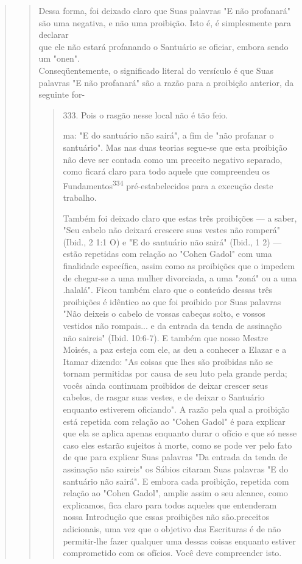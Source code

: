 \begin{quote}
\begin{quote}
Dessa forma, foi deixado claro que Suas palavras "E não profanará"\\
são uma negativa, e não uma proibição. Isto é, é simplesmente para
declarar\\
que ele não estará profanando o Santuário se oficiar, embora sendo um
"onen".\\
Conseqüentemente, o significado literal do versículo é que Suas palavras
"E não profanará" são a razão para a proibição anterior, da
seguinte for-

\begin{quote}
333. Pois o rasgão nesse local não é tão feio.

ma: "E do santuário não sairá", a fim de "não profanar o santuário". Mas
nas duas teorias segue-se que esta proibição não deve ser contada como
um precei­to negativo separado, como ficará claro para todo aquele que
compreendeu os Fundamentos\textsuperscript{334} pré-estabelecidos para a
execução deste trabalho.

Também foi deixado claro que estas três proibições --- a saber, "Seu
cabelo não deixará crescere suas vestes não romperá" (Ibid., 2 1:1 O) e
"E do santuário não sairá" (Ibid., 1 2) --- estão repetidas com relação
ao "Cohen Ga­dol" com uma finalidade específica, assim como as
proibições que o impedem de chegar-se a uma mulher divorciada, a uma
"zoná" ou a uma .halalá". Ficou também claro que o
conteúdo dessas três proibições é idêntico ao que foi proi­bido por Suas
palavras "Não deixeis o cabelo de vossas cabeças solto, e vossos
vestidos não rompais... e da entrada da tenda de assinação não saireis"
(Ibid. 10:6-7). E também que nosso Mestre Moisés, a paz esteja com ele,
as deu a co­nhecer a Elazar e a Itamar dizendo: "As coisas que lhes são
proibidas não se tornam permitidas por causa de seu luto pela grande
perda; vocês ainda conti­nuam proibidos de deixar crescer seus cabelos,
de rasgar suas vestes, e de dei­xar o Santuário enquanto estiverem
oficiando". A razão pela qual a proibição está repetida com relação ao
"Cohen Gadol" é para explicar que ela se aplica apenas enquanto durar o
ofício e que só nesse caso eles estarão sujeitos à mor­te, como se pode
ver pelo fato de que para explicar Suas palavras "Da entrada da tenda de
assinação não saireis" os Sábios citaram Suas palavras "E do san­tuário
não sairá". E embora cada proibição, repetida com relação ao "Cohen
Gadol", amplie assim o seu alcance, como explicamos, fica claro para
todos aqueles que entenderam nossa Introdução que essas proibições não
são.precei­tos adicionais, uma vez que o objetivo das
Escrituras é de não permitir-lhe fa­zer qualquer uma dessas coisas
enquanto estiver comprometido com os ofícios. Você deve compreender
isto.


\end{quote}
\end{quote}
\end{quote}
